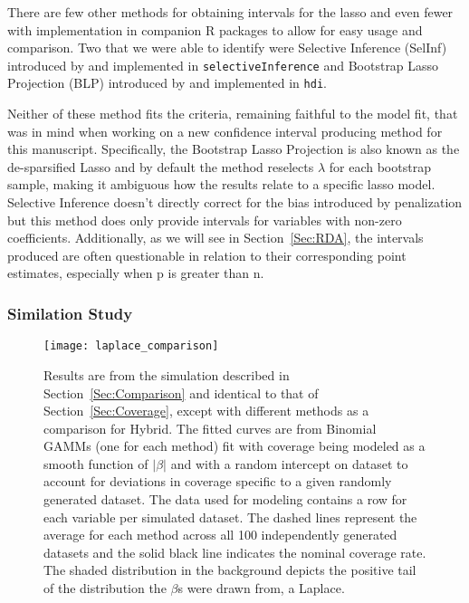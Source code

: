 There are few other methods for obtaining intervals for the lasso and even fewer with implementation in companion R packages to allow for easy usage and comparison. Two that we were able to identify were Selective Inference (SelInf) introduced by \cite{LeeEtAl2016} and implemented in \texttt{selectiveInference} and Bootstrap Lasso Projection (BLP) introduced by \cite{ZhangZhang2014} and implemented in \texttt{hdi}.

Neither of these method fits the criteria, remaining faithful to the model fit, that was in mind when working on a new confidence interval producing method for this manuscript. Specifically, the Bootstrap Lasso Projection is also known as the de-sparsified Lasso and by default the method reselects $\lambda$ for each bootstrap sample, making it ambiguous how the results relate to a specific lasso model. Selective Inference doesn't directly correct for the bias introduced by penalization but this method does only provide intervals for variables with non-zero coefficients. Additionally, as we will see in Section~\ref{Sec:RDA}, the intervals produced are often questionable in relation to their corresponding point estimates, especially when p is greater than n.

\subsubsection{Similation Study}

\begin{figure}[hbtp]
  \begin{center}
  \texttt{[image: laplace\_comparison]}
  \caption{\label{Fig:laplace_comparison} Results are from the simulation described in Section~\ref{Sec:Comparison} and identical to that of Section~\ref{Sec:Coverage}, except with different methods as a comparison for Hybrid. The fitted curves are from Binomial GAMMs (one for each method) fit with coverage being modeled as a smooth function of $|\beta|$ and with a random intercept on dataset to account for deviations in coverage specific to a given randomly generated dataset. The data used for modeling contains a row for each variable per simulated dataset. The dashed lines represent the average for each method across all 100 independently generated datasets and the solid black line indicates the nominal coverage rate. The shaded distribution in the background depicts the positive tail of the distribution the $\beta$s were drawn from, a Laplace.}
  \end{center}
\end{figure}

